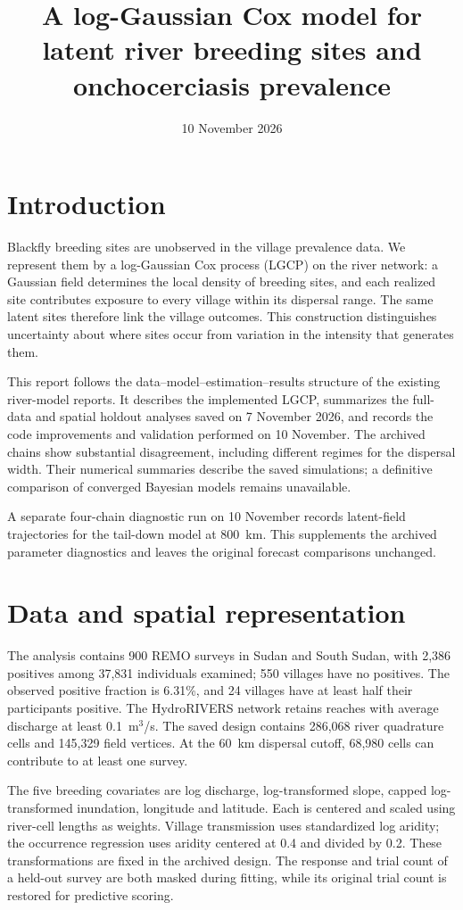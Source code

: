 \documentclass[11pt,a4paper]{article}
\title{A log-Gaussian Cox model for latent river breeding sites and onchocerciasis prevalence}
\author{}
\date{10 November 2026}
\begin{document}
\maketitle

\section{Introduction}

Blackfly breeding sites are unobserved in the village prevalence data. We represent them by a log-Gaussian Cox process (LGCP) on the river network: a Gaussian field determines the local density of breeding sites, and each realized site contributes exposure to every village within its dispersal range. The same latent sites therefore link the village outcomes. This construction distinguishes uncertainty about where sites occur from variation in the intensity that generates them.

This report follows the data--model--estimation--results structure of the existing river-model reports. It describes the implemented LGCP, summarizes the full-data and spatial holdout analyses saved on 7 November 2026, and records the code improvements and validation performed on 10 November. The archived chains show substantial disagreement, including different regimes for the dispersal width. Their numerical summaries describe the saved simulations; a definitive comparison of converged Bayesian models remains unavailable.

A separate four-chain diagnostic run on 10 November records latent-field trajectories for the tail-down model at 800~km. This supplements the archived parameter diagnostics and leaves the original forecast comparisons unchanged.

\section{Data and spatial representation}

The analysis contains 900 REMO surveys in Sudan and South Sudan, with 2,386 positives among 37,831 individuals examined; 550 villages have no positives. The observed positive fraction is 6.31\%, and 24 villages have at least half their participants positive. The HydroRIVERS network retains reaches with average discharge at least 0.1~m$^3$/s. The saved design contains 286,068 river quadrature cells and 145,329 field vertices. At the 60~km dispersal cutoff, 68,980 cells can contribute to at least one survey.

The five breeding covariates are log discharge, log-transformed slope, capped log-transformed inundation, longitude and latitude. Each is centered and scaled using river-cell lengths as weights. Village transmission uses standardized log aridity; the occurrence regression uses aridity centered at 0.4 and divided by 0.2. These transformations are fixed in the archived design. The response and trial count of a held-out survey are both masked during fitting, while its original trial count is restored for predictive scoring.
\end{document}
